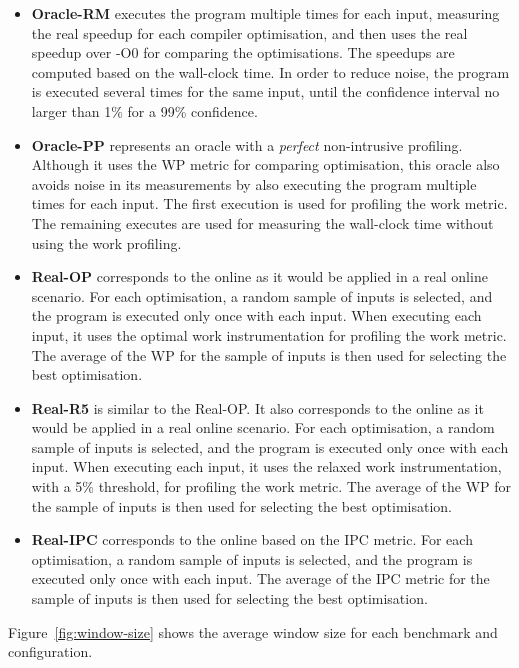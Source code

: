 \begin{itemize}
\item \textbf{Oracle-RM} executes the program multiple times for each input, measuring the real speedup for each compiler optimisation, and then uses the real speedup over {\flagstype -O0} for comparing the optimisations.
The speedups are computed based on the wall-clock time.
In order to reduce noise, the program is executed several times for the same input, until the confidence interval no larger than 1\% for a 99\% confidence.
\item \textbf{Oracle-PP} represents an oracle with a \textit{perfect} non-intrusive profiling.
  Although it uses the WP metric for comparing optimisation, this oracle also avoids noise in its measurements by also executing the program multiple times for each input.
  The first execution is used for profiling the work metric.
  The remaining executes are used for measuring the wall-clock time without using the work profiling.
\item \textbf{Real-OP} corresponds to the online {\itercomp} as it would be applied in a real online scenario.
  For each optimisation, a random sample of inputs is selected, and the program is executed only once with each input.
  When executing each input, it uses the optimal work instrumentation for profiling the work metric.
  The average of the WP for the sample of inputs is then used for selecting the best optimisation.
\item \textbf{Real-R5} is similar to the {Real-OP}.
  It also corresponds to the online {\itercomp} as it would be applied in a real online scenario.
  For each optimisation, a random sample of inputs is selected, and the program is executed only once with each input.
  When executing each input, it uses the relaxed work instrumentation, with a 5\% threshold, for profiling the work metric.
  The average of the WP for the sample of inputs is then used for selecting the best optimisation.
\item \textbf{Real-IPC} corresponds to the online {\itercomp} based on the IPC metric.
  For each optimisation, a random sample of inputs is selected, and the program is executed only once with each input.
  The average of the IPC metric for the sample of inputs is then used for selecting the best optimisation.
\end{itemize}
Figure~\ref{fig:window-size} shows the average window size for each benchmark and configuration.

